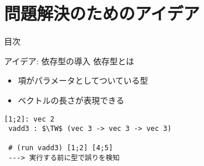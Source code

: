 \documentclass[dvipdfmx,aspectratio=169, 20pt]{beamer}
\renewcommand{\V}{\vdash}
\begin{document}
\section{問題解決のためのアイデア}

\begin{frame}{目次}
    \tableofcontents[currentsection]
\end{frame}

\begin{frame}[fragile]{アイデア: 依存型の導入}
    \renewcommand{\V}{\text{vec}\ }
    依存型とは
    \begin{itemize}
        \item 項がパラメータとしてついている型
        \item ベクトルの長さが表現できる
    \end{itemize}
    \begin{exampleblock}{}
        \begin{Verbatim}[commandchars=\\\{\},codes={\catcode`$=3\catcode`^=7}]
 [1;2]: vec 2
 vadd3 : $\TW$ (vec 3 -> vec 3 -> vec 3)

 # (run vadd3) [1;2] [4;5]
 ---> 実行する前に型で誤りを検知
 \end{Verbatim}
    \end{exampleblock}
\end{frame}
\end{document}
